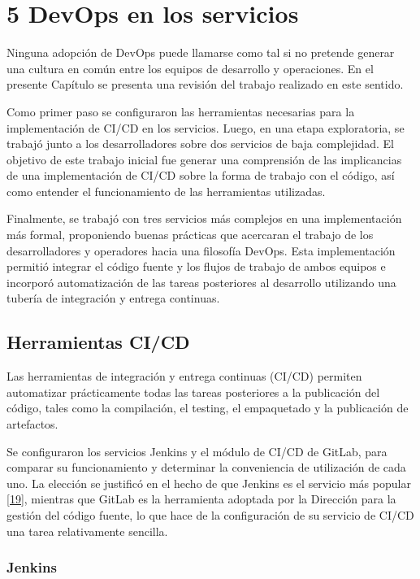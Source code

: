 \section{5 DevOps en los servicios}

Ninguna adopción de DevOps puede llamarse como tal si no pretende generar una cultura en común entre los equipos de desarrollo y operaciones. En el presente Capítulo se presenta una revisión del trabajo realizado en este sentido.

Como primer paso se configuraron las herramientas necesarias para la implementación de CI/CD en los servicios. Luego, en una etapa exploratoria, se trabajó junto a los desarrolladores sobre dos servicios de baja complejidad. El objetivo de este trabajo inicial fue generar una comprensión de las implicancias de una implementación de CI/CD sobre la forma de trabajo con el código, así como entender el funcionamiento de las herramientas utilizadas.

Finalmente, se trabajó con tres servicios más complejos en una implementación más formal, proponiendo buenas prácticas que acercaran el trabajo de los desarrolladores y operadores hacia una filosofía DevOps. Esta implementación permitió integrar el código fuente y los flujos de trabajo de ambos equipos e incorporó automatización de las tareas posteriores al desarrollo utilizando una tubería de integración y entrega continuas.

\subsection{Herramientas CI/CD}

Las herramientas de integración y entrega continuas (CI/CD) permiten automatizar prácticamente todas las tareas posteriores a la publicación del código, tales como la compilación, el testing, el empaquetado y la publicación de artefactos.

Se configuraron los servicios Jenkins y el módulo de CI/CD de GitLab, para comparar su funcionamiento y determinar la conveniencia de utilización de cada uno. La elección se justificó en el hecho de que Jenkins es el servicio más popular \href{https://www.zotero.org/google-docs/?VQPh0a}{[19]}, mientras que GitLab es la herramienta adoptada por la Dirección para la gestión del código fuente, lo que hace de la configuración de su servicio de CI/CD una tarea relativamente sencilla.

\subsubsection{Jenkins}

